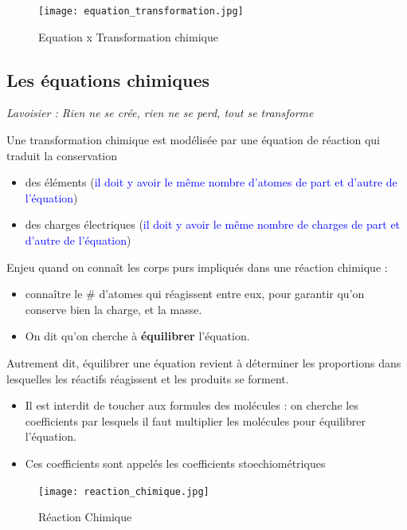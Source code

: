 \documentclass[a4paper,12pt]{article}
\begin{document}
\begin{figure}[H]
  \centering
  \texttt{[image: equation\_transformation.jpg]}
  \caption{\label{} Equation x Transformation chimique}
\end{figure}

\subsection{Les équations chimiques}

\textit{Lavoisier : Rien ne se crée, rien ne se perd, tout se transforme} \par 
\vspace{1em}
Une transformation chimique est modélisée par une équation de réaction qui traduit la conservation 
\begin{itemize}[noitemsep]
  \item des éléments (\textcolor{blue}{il doit y avoir le même nombre d'atomes de part et d'autre de l'équation})
  \item des charges électriques (\textcolor{blue}{il doit y avoir le même nombre de charges de part et d'autre de l'équation})
\end{itemize}

Enjeu quand on connaît les corps purs impliqués dans une réaction chimique :

\begin{itemize}[noitemsep]
  \item connaître le \# d'atomes qui réagissent entre eux, pour garantir qu'on conserve bien la charge, et la masse.
  \item On dit qu'on cherche à \textbf{équilibrer} l'équation.
\end{itemize} \par

Autrement dit, équilibrer une équation revient à déterminer les proportions dans lesquelles les réactifs réagissent et les produits se forment. \par

\begin{itemize}[noitemsep]
  \item Il est interdit de toucher aux formules des molécules : on cherche les coefficients par lesquels il faut multiplier les molécules pour équilibrer l'équation.
  \item Ces coefficients sont appelés les coefficients stoechiométriques
\end{itemize}

\begin{figure}[H]
  \centering
  \texttt{[image: reaction\_chimique.jpg]}
  \caption{\label{} Réaction Chimique}
\end{figure}
\end{document}
